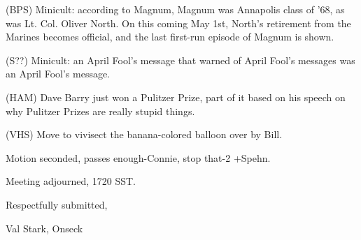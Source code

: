 \documentclass[12pt]{article}
\begin{document}
(BPS) Minicult: according to Magnum, Magnum was Annapolis class of '68, as was Lt. Col. Oliver North. On this coming May 1st, North's retirement from the Marines becomes official, and the last first-run episode of Magnum is shown.

(S??) Minicult: an April Fool's message that warned of April Fool's messages was an April Fool's message.

(HAM) Dave Barry just won a Pulitzer Prize, part of it based on his speech on why Pulitzer Prizes are really stupid things.

(VHS) Move to vivisect the banana-colored balloon over by Bill.

Motion seconded, passes enough-Connie, stop that-2 +Spehn.

\vspace{12pt}

\noindent
Meeting adjourned, 1720 SST.

\vspace{18pt}

\centerline{Respectfully submitted,}
\centerline{Val Stark, Onseck}
\end{document}
